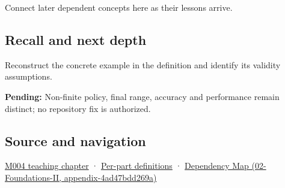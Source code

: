 Connect later dependent concepts here as their lessons arrive.

\subsection{Recall and next depth}\label{recall-and-next-depth}

Reconstruct the concrete example in the definition and identify its validity assumptions.

\textbf{Pending:} Non-finite policy, final range, accuracy and performance remain distinct; no repository fix is authorized.

\subsection{Source and navigation}\label{source-and-navigation}

\href{Continuous\%20Notes/Computing\%20Foundations\%20-\%20From\%20Bits\%20to\%20C++\%20and\%20Systems\%20APIs\#A\%20stretching\%20ruler\%20for\%20real-valued\%20quantities}{M004 teaching chapter} · \hyperref[appendix-fd090d982a15]{Per-part definitions} · \href{}{Dependency Map (02-Foundations-II, appendix-4ad47bdd269a)}
